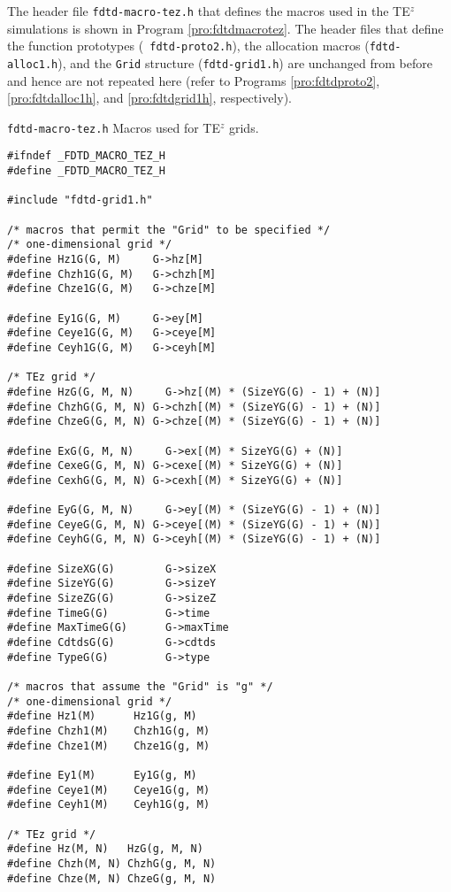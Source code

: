 The header file {\tt fdtd-macro-tez.h} that defines the macros used in
the TE$^z$ simulations is shown in Program \ref{pro:fdtdmacrotez}.
The header files that define the function prototypes ({\tt
fdtd-proto2.h}), the allocation macros ({\tt fdtd-alloc1.h}), and the
{\tt Grid} structure ({\tt fdtd-grid1.h}) are unchanged from before
and hence are not repeated here (refer to Programs
\ref{pro:fdtdproto2}, \ref{pro:fdtdalloc1h}, and \ref{pro:fdtdgrid1h},
respectively).

\begin{program}
{\tt fdtd-macro-tez.h} Macros used for TE$^z$ grids.
\label{pro:fdtdmacrotez}
\codemiddle
\begin{lstlisting}
#ifndef _FDTD_MACRO_TEZ_H
#define _FDTD_MACRO_TEZ_H

#include "fdtd-grid1.h"

/* macros that permit the "Grid" to be specified */
/* one-dimensional grid */
#define Hz1G(G, M)     G->hz[M]
#define Chzh1G(G, M)   G->chzh[M]
#define Chze1G(G, M)   G->chze[M]

#define Ey1G(G, M)     G->ey[M]
#define Ceye1G(G, M)   G->ceye[M]
#define Ceyh1G(G, M)   G->ceyh[M]

/* TEz grid */
#define HzG(G, M, N)     G->hz[(M) * (SizeYG(G) - 1) + (N)]
#define ChzhG(G, M, N) G->chzh[(M) * (SizeYG(G) - 1) + (N)]
#define ChzeG(G, M, N) G->chze[(M) * (SizeYG(G) - 1) + (N)]

#define ExG(G, M, N)     G->ex[(M) * SizeYG(G) + (N)]
#define CexeG(G, M, N) G->cexe[(M) * SizeYG(G) + (N)]
#define CexhG(G, M, N) G->cexh[(M) * SizeYG(G) + (N)]

#define EyG(G, M, N)     G->ey[(M) * (SizeYG(G) - 1) + (N)]
#define CeyeG(G, M, N) G->ceye[(M) * (SizeYG(G) - 1) + (N)]
#define CeyhG(G, M, N) G->ceyh[(M) * (SizeYG(G) - 1) + (N)]

#define SizeXG(G)        G->sizeX
#define SizeYG(G)        G->sizeY
#define SizeZG(G)        G->sizeZ
#define TimeG(G)         G->time
#define MaxTimeG(G)      G->maxTime
#define CdtdsG(G)        G->cdtds
#define TypeG(G)         G->type

/* macros that assume the "Grid" is "g" */
/* one-dimensional grid */
#define Hz1(M)      Hz1G(g, M)
#define Chzh1(M)    Chzh1G(g, M)
#define Chze1(M)    Chze1G(g, M)

#define Ey1(M)      Ey1G(g, M)
#define Ceye1(M)    Ceye1G(g, M)
#define Ceyh1(M)    Ceyh1G(g, M)

/* TEz grid */
#define Hz(M, N)   HzG(g, M, N)
#define Chzh(M, N) ChzhG(g, M, N)
#define Chze(M, N) ChzeG(g, M, N) 


\end{lstlisting}
\end{program}

